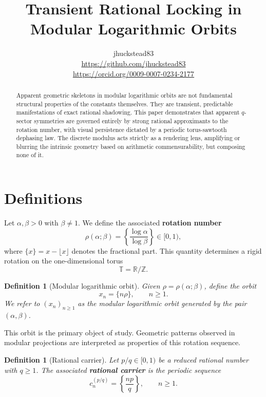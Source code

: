 \documentclass[11pt]{article}
\title{Transient Rational Locking in Modular Logarithmic Orbits}
\author{jhuckstead83\\\small \url{https://github.com/jhuckstead83}\\\small \url{https://orcid.org/0009-0007-0234-2177}}
\date{}
\newtheorem{definition}[theorem]{Definition}
\newcommand{\T}{\mathbb{T}}
\begin{document}
\maketitle

\begin{abstract}
Apparent geometric skeletons in modular logarithmic orbits are not fundamental structural properties of the constants themselves. They are transient, predictable manifestations of exact rational shadowing. This paper demonstrates that apparent $q$-sector symmetries are governed entirely by strong rational approximants to the rotation number, with visual persistence dictated by a periodic torus-sawtooth dephasing law. The discrete modulus acts strictly as a rendering lens, amplifying or blurring the intrinsic geometry based on arithmetic commensurability, but composing none of it.
\end{abstract}

\vspace{0.4cm}

\section{Definitions}

Let $\alpha,\beta>0$ with $\beta\neq 1$. We define the associated \textbf{rotation number}
\begin{equation}
\rho(\alpha;\beta)
=
\left\{\frac{\log \alpha}{\log \beta}\right\}
\in [0,1),
\end{equation}
where $\{x\}=x-\lfloor x\rfloor$ denotes the fractional part. This quantity determines a rigid rotation on the one-dimensional torus
\[
\T=\mathbb{R}/\mathbb{Z}.
\]

\begin{definition}[Modular logarithmic orbit]
Given $\rho=\rho(\alpha;\beta)$, define the orbit
\[
x_n=\{n\rho\}, \qquad n\ge 1.
\]
We refer to $(x_n)_{n\ge 1}$ as the \emph{modular logarithmic orbit} generated by the pair $(\alpha,\beta)$.
\end{definition}

This orbit is the primary object of study. Geometric patterns observed in modular projections are interpreted as properties of this rotation sequence.

\begin{definition}[Rational carrier]
Let $p/q\in [0,1)$ be a reduced rational number with $q\ge 1$. The associated \textbf{rational carrier} is the periodic sequence
\[
c_n^{(p/q)}=\left\{\frac{np}{q}\right\}, \qquad n\ge 1.
\]
\end{definition}
\end{document}
